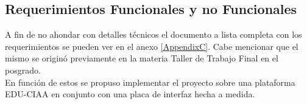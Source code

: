 \subsection{ Requerimientos Funcionales y no Funcionales }
\label{subsec:Requerimientos}

A fin de no ahondar con detalles técnicos el documento a lista completa con los requerimientos se pueden ver en el anexo \ref{AppendixC}. Cabe mencionar que el mismo se originó previamente en la materia Taller de Trabajo Final en el posgrado.
\\
En función de estos se propuso implementar el proyecto sobre una plataforma EDU-CIAA en conjunto con una placa de interfaz hecha a medida. 







